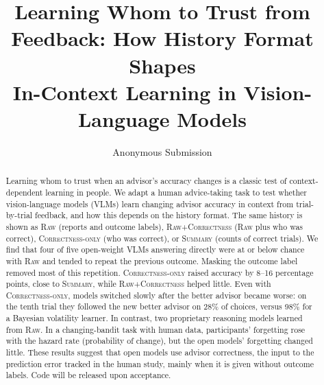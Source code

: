 \documentclass[letterpaper]{article} %
\title{Learning Whom to Trust from Feedback: How History Format Shapes\\In-Context Learning in Vision-Language Models}
\author{
    Anonymous Submission
}
\newcommand{\Raw}{\textsc{Raw}}
\newcommand{\RawCorrectness}{\textsc{Raw+Correctness}}
\newcommand{\CorrectnessOnly}{\textsc{Correctness-only}}
\newcommand{\Summary}{\textsc{Summary}}
\begin{document}
\maketitle

\begin{abstract}
Learning whom to trust when an advisor's accuracy changes is a classic test of context-dependent learning in people. We adapt a human advice-taking task to test whether vision-language models (VLMs) learn changing advisor accuracy in context from trial-by-trial feedback, and how this depends on the history format. The same history is shown as \Raw{} (reports and outcome labels), \RawCorrectness{} (\Raw{} plus who was correct), \CorrectnessOnly{} (who was correct), or \Summary{} (counts of correct trials). We find that four of five open-weight VLMs answering directly were at or below chance with \Raw{} and tended to repeat the previous outcome. Masking the outcome label removed most of this repetition. \CorrectnessOnly{} raised accuracy by 8--16 percentage points, close to \Summary{}, while \RawCorrectness{} helped little. Even with \CorrectnessOnly{}, models switched slowly after the better advisor became worse: on the tenth trial they followed the new better advisor on 28\% of choices, versus 98\% for a Bayesian volatility learner. In contrast, two proprietary reasoning models learned from \Raw{}. In a changing-bandit task with human data, participants' forgetting rose with the hazard rate (probability of change), but the open models' forgetting changed little. These results suggest that open models use advisor correctness, the input to the prediction error tracked in the human study, mainly when it is given without outcome labels. Code will be released upon acceptance.
\end{abstract}

\end{document}
